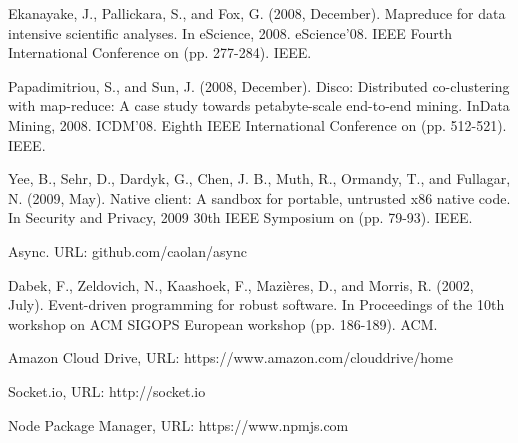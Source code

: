 \documentclass[10pt,reprint]{socc14}
\begin{document}
\begin{thebibliography}{}
Ekanayake, J., Pallickara, S., and Fox, G. (2008, December). Mapreduce for data intensive scientific 
analyses. In eScience, 2008. eScience'08. IEEE Fourth International Conference on (pp. 277-284). 
IEEE.


Papadimitriou, S., and Sun, J. (2008, December). Disco: Distributed co-clustering with map-reduce: A 
case study towards petabyte-scale end-to-end mining. InData Mining, 2008. ICDM'08. Eighth IEEE 
International Conference on (pp. 512-521). IEEE.


Yee, B., Sehr, D., Dardyk, G., Chen, J. B., Muth, R., Ormandy, T., and Fullagar, N. (2009, May). 
Native client: A sandbox for portable, untrusted x86 native code. In Security and Privacy, 2009 30th 
IEEE Symposium on (pp. 79-93). IEEE.


Async. URL: github.com/caolan/async


Dabek, F., Zeldovich, N., Kaashoek, F., Mazières, D., and Morris, R. (2002, July). Event-driven 
programming for robust software. In Proceedings of the 10th workshop on ACM SIGOPS European 
workshop (pp. 186-189). ACM.


Amazon Cloud Drive, URL: https://www.amazon.com/clouddrive/home


Socket.io, URL: http://socket.io

Node Package Manager, URL: https://www.npmjs.com

\end{thebibliography}
\end{document}
